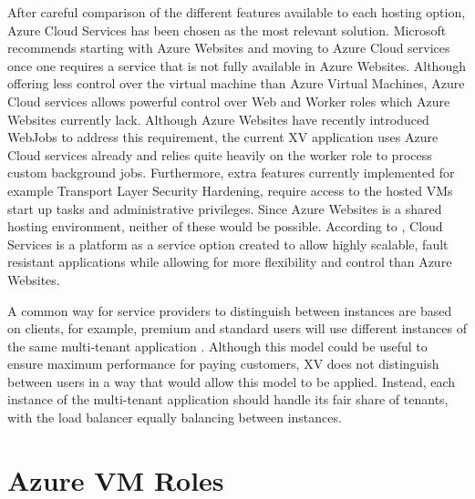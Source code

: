After careful comparison of the different features available to each hosting option, Azure Cloud Services has been chosen as the most relevant solution. Microsoft recommends starting with Azure Websites and moving to Azure Cloud services once one requires a service that is not fully available in Azure Websites. Although offering less control over the virtual machine than Azure Virtual Machines, Azure Cloud services allows powerful control over Web and Worker roles which Azure Websites currently lack. Although Azure Websites have recently introduced WebJobs to address this requirement, the current XV application uses Azure Cloud services already and relies quite heavily on the worker role to process custom background jobs. Furthermore, extra features currently implemented for example Transport Layer Security Hardening, require access to the hosted VMs start up tasks and administrative privileges. Since Azure Websites is a shared hosting environment, neither of these would be possible.  According to \cite{Microsoft_Corporation_undated-ej}, Cloud Services is a platform as a service option created to allow highly scalable, fault resistant applications while allowing for more flexibility and control than Azure Websites.
 
A common way for service providers to distinguish between instances are based on clients, for example, premium and standard users will use different instances of the same multi-tenant application \cite{Betts2012-ad}. Although this model could be useful to ensure maximum performance for paying customers, XV does not distinguish between users in a way that would allow this model to be applied. Instead, each instance of the multi-tenant application should handle its fair share of tenants, with the load balancer equally balancing between instances.

\section{Azure VM Roles}

